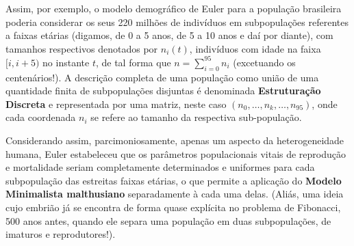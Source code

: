 
Assim, por exemplo, o modelo demográfico de Euler para a população brasileira poderia considerar os seus 220 milhões de indivíduos em subpopulações referentes a faixas etárias (digamos, de 0 a 5 anos, de 5 a 10 anos e daí por diante), com tamanhos respectivos denotados por \(n_i(t)\), indivíduos com idade na faixa \([i, i+5)\) no instante \(t\), de tal forma que \(n = \sum_{i=0}^{95} n_i\) (excetuando os centenários!). A descrição completa de uma população como união de uma quantidade finita de subpopulações disjuntas é denominada \textbf{Estruturação Discreta} e representada por uma matriz, neste caso \((n_0, \ldots, n_k, \ldots, n_{95})\), onde cada coordenada \(n_i\) se refere ao tamanho da respectiva sub-população.

Considerando assim, parcimoniosamente, apenas um aspecto da heterogeneidade humana, Euler estabeleceu que os parâmetros populacionais vitais de reprodução e mortalidade seriam completamente determinados e uniformes para cada subpopulação das estreitas faixas etárias, o que permite a aplicação do \textbf{Modelo Minimalista malthusiano} separadamente à cada uma delas. {\tiny \color{red!50} (Aliás, uma ideia cujo embrião já se encontra de forma quase explícita no problema de Fibonacci, 500 anos antes, quando ele separa uma população em duas subpopulações, de imaturos e reprodutores!).}

